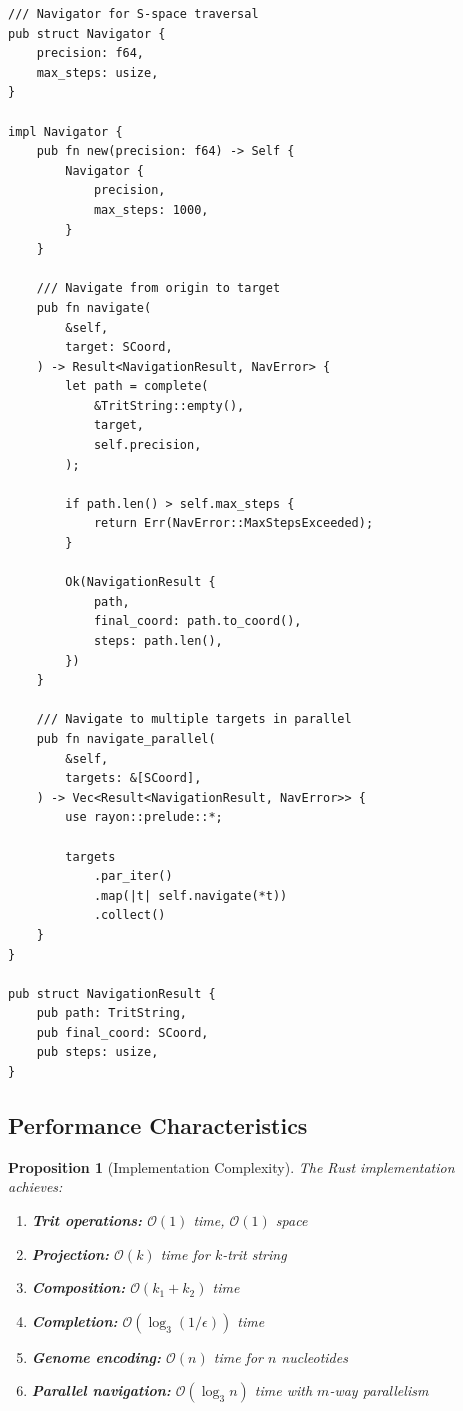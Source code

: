 \documentclass[twocolumn,10pt]{article}
\newtheorem{proposition}[theorem]{Proposition}
\theoremstyle{remark}
\newcommand{\bigO}{\mathcal{O}}
\begin{document}
\begin{lstlisting}[style=rust]
/// Navigator for S-space traversal
pub struct Navigator {
    precision: f64,
    max_steps: usize,
}

impl Navigator {
    pub fn new(precision: f64) -> Self {
        Navigator {
            precision,
            max_steps: 1000,
        }
    }

    /// Navigate from origin to target
    pub fn navigate(
        &self,
        target: SCoord,
    ) -> Result<NavigationResult, NavError> {
        let path = complete(
            &TritString::empty(),
            target,
            self.precision,
        );

        if path.len() > self.max_steps {
            return Err(NavError::MaxStepsExceeded);
        }

        Ok(NavigationResult {
            path,
            final_coord: path.to_coord(),
            steps: path.len(),
        })
    }

    /// Navigate to multiple targets in parallel
    pub fn navigate_parallel(
        &self,
        targets: &[SCoord],
    ) -> Vec<Result<NavigationResult, NavError>> {
        use rayon::prelude::*;

        targets
            .par_iter()
            .map(|t| self.navigate(*t))
            .collect()
    }
}

pub struct NavigationResult {
    pub path: TritString,
    pub final_coord: SCoord,
    pub steps: usize,
}
\end{lstlisting}

\subsection{Performance Characteristics}

\begin{proposition}[Implementation Complexity]
The Rust implementation achieves:
\begin{enumerate}
\item \textbf{Trit operations:} $\bigO(1)$ time, $\bigO(1)$ space
\item \textbf{Projection:} $\bigO(k)$ time for $k$-trit string
\item \textbf{Composition:} $\bigO(k_1 + k_2)$ time
\item \textbf{Completion:} $\bigO(\log_3(1/\epsilon))$ time
\item \textbf{Genome encoding:} $\bigO(n)$ time for $n$ nucleotides
\item \textbf{Parallel navigation:} $\bigO(\log_3 n)$ time with $m$-way parallelism
\end{enumerate}
\end{proposition}
\end{document}
